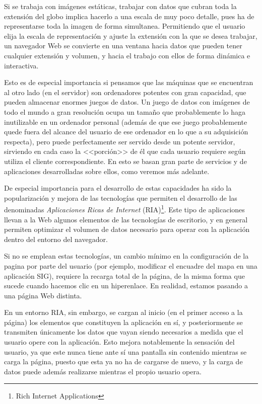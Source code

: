 Si se trabaja con imágenes estáticas, trabajar con datos que cubran toda la extensión del globo implica hacerlo a una escala de muy poco detalle, pues ha de representarse toda la imagen de forma simultanea. Permitiendo que el usuario elija la escala de representación y ajuste la extensión con la que se desea trabajar, un navegador Web se convierte en una ventana hacia datos que pueden tener cualquier extensión y volumen, y hacia el trabajo con ellos de forma dinámica e interactiva.

Esto es de especial importancia si pensamos que las máquinas que se encuentran al otro lado (en el servidor) son ordenadores potentes con gran capacidad, que pueden almacenar enormes juegos de datos. Un juego de datos con imágenes de todo el mundo a gran resolución ocupa un tamaño que probablemente lo haga inutilizable en un ordenador personal (además de que ese juego probablemente quede fuera del alcance del usuario de ese ordenador en lo que a su adquisición respecta), pero puede perfectamente ser servido desde un potente servidor, sirviendo en cada caso la <<porción>> de él que cada usuario requiere según utiliza el cliente correspondiente. En esto se basan gran parte de servicios y de aplicaciones desarrolladas sobre ellos, como veremos más adelante.

De especial importancia para el desarrollo de estas capacidades ha sido la popularización y mejora de las tecnologías que permiten el desarrollo de las denominadas \emph{Aplicaciones Ricas de Internet} (RIA)\footnote{Rich Internet Applications}. Este tipo de aplicaciones llevan a la Web algunos elementos de las tecnologías de escritorio, y en general permiten optimizar el volumen de datos necesario para operar con la aplicación dentro del entorno del navegador.

Si no se emplean estas tecnologías, un cambio mínimo en la configuración de la pagina por parte del usuario (por ejemplo, modificar el encuadre del mapa en una aplicación SIG), requiere la recarga total de la página, de la misma forma que sucede cuando hacemos clic en un hiperenlace. En realidad, estamos pasando a una página Web distinta. 

En un entorno RIA, sin embargo, se cargan al inicio (en el primer acceso a la página) los elementos que constituyen la aplicación en sí, y posteriormente se transmiten únicamente los datos que vayan siendo necesarios a medida que el usuario opere con la aplicación. Esto mejora notablemente la sensación del usuario, ya que este nunca tiene ante sí una pantalla sin contenido mientras se carga la página, puesto que esta ya no ha de cargarse de nuevo, y la carga de datos puede además realizarse mientras el propio usuario opera.

